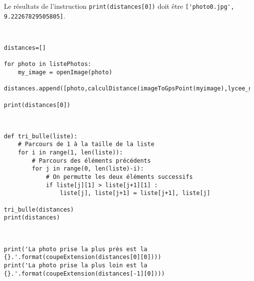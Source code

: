 
Le résultats de l'instruction \verb?print(distances[0])? doit être \verb?['photo0.jpg', 9.22267829505805]?.

\begin{solution}~\ \\
\begin{verbatim}
distances=[]

for photo in listePhotos:
    my_image = openImage(photo)
    distances.append([photo,calculDistance(imageToGpsPoint(myimage),lycee_dorian)])

print(distances[0])   
\end{verbatim}
\end{solution}


\begin{solution}~\ \\
\begin{verbatim}
def tri_bulle(liste):
    # Parcours de 1 à la taille de la liste
    for i in range(1, len(liste)):
        # Parcours des éléments précédents
        for j in range(0, len(liste)-i):
            # On permutte les deux éléments successifs
            if liste[j][1] > liste[j+1][1] :
                liste[j], liste[j+1] = liste[j+1], liste[j]

tri_bulle(distances)
print(distances)
\end{verbatim}
\end{solution}


\begin{solution}~\ \\
\begin{verbatim}
print('La photo prise la plus près est la {}.'.format(coupeExtension(distances[0][0])))
print('La photo prise la plus loin est la {}.'.format(coupeExtension(distances[-1][0])))
\end{verbatim}
\end{solution}


